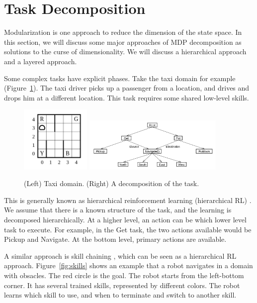 \section{Task Decomposition}

Modularization is one approach to reduce the dimension of the state space. In
this section, we will discuss some major approaches of MDP decomposition as
solutions to the curse of dimensionality. We will discuss a hierarchical
approach and a layered approach.

Some complex tasks have explicit phases. Take the taxi domain for example
(Figure~\ref{fig:taxi}). The taxi driver picks up a passenger from a location,
and drives and drops him at a different location. This task requires some shared
low-level skills.

\begin{figure}[h]
\centering
\includegraphics[width=0.3\textwidth]{taxi.png}
\includegraphics[width=0.6\textwidth]{maxq.png}
\caption{(Left) Taxi domain. (Right) A decomposition of the task.}
\label{fig:taxi}
\end{figure}

This is generally known as hierarchical reinforcement learning (hierarchical RL)
\cite{dietterich2000hierarchical}.
We assume that there is a known structure of the task, and the
learning is decomposed hierarchically. At a higher level, an action can be
which lower level task to execute. For example, in the Get task, the two actions
available would be Pickup and Navigate. At the bottom level, primary actions are
available.

A similar approach is skill chaining \cite{konidaris2009skill}, which can
be seen as a hierarchical RL approach. Figure~\ref{fig:skills} shows
an example that a robot navigates in a domain with obsacles. The red circle is
the goal. The robot starts from the left-bottom corner. It has several trained
skills, represented by different colors. The robot learns which skill to use,
and when to terminate and switch to another skill.

